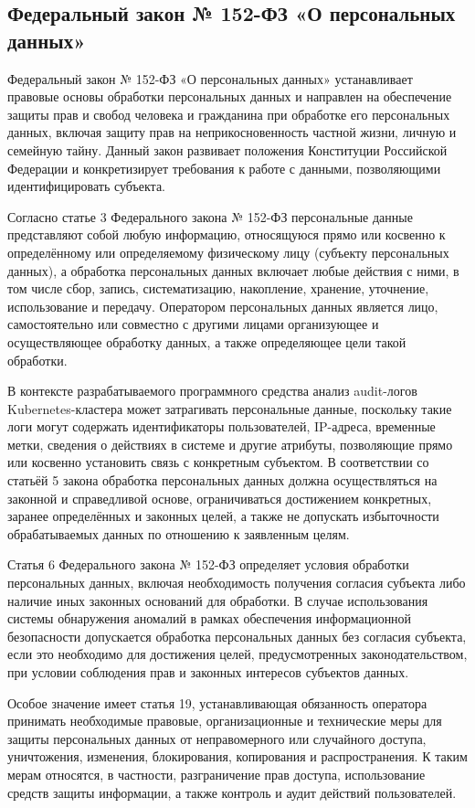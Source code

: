 \subsection{Федеральный закон № 152-ФЗ «О персональных данных»}

Федеральный закон № 152-ФЗ «О персональных данных» устанавливает правовые основы обработки персональных данных и направлен на обеспечение защиты прав и свобод человека и гражданина при обработке его персональных данных, включая защиту прав на неприкосновенность частной жизни, личную и семейную тайну. Данный закон развивает положения Конституции Российской Федерации и конкретизирует требования к работе с данными, позволяющими идентифицировать субъекта.

Согласно статье 3 Федерального закона № 152-ФЗ персональные данные представляют собой любую информацию, относящуюся прямо или косвенно к определённому или определяемому физическому лицу (субъекту персональных данных), а обработка персональных данных включает любые действия с ними, в том числе сбор, запись, систематизацию, накопление, хранение, уточнение, использование и передачу. Оператором персональных данных является лицо, самостоятельно или совместно с другими лицами организующее и осуществляющее обработку данных, а также определяющее цели такой обработки.

В контексте разрабатываемого программного средства анализ audit-логов Kubernetes-кластера может затрагивать персональные данные, поскольку такие логи могут содержать идентификаторы пользователей, IP-адреса, временные метки, сведения о действиях в системе и другие атрибуты, позволяющие прямо или косвенно установить связь с конкретным субъектом. В соответствии со статьёй 5 закона обработка персональных данных должна осуществляться на законной и справедливой основе, ограничиваться достижением конкретных, заранее определённых и законных целей, а также не допускать избыточности обрабатываемых данных по отношению к заявленным целям.

Статья 6 Федерального закона № 152-ФЗ определяет условия обработки персональных данных, включая необходимость получения согласия субъекта либо наличие иных законных оснований для обработки. В случае использования системы обнаружения аномалий в рамках обеспечения информационной безопасности допускается обработка персональных данных без согласия субъекта, если это необходимо для достижения целей, предусмотренных законодательством, при условии соблюдения прав и законных интересов субъектов данных.

Особое значение имеет статья 19, устанавливающая обязанность оператора принимать необходимые правовые, организационные и технические меры для защиты персональных данных от неправомерного или случайного доступа, уничтожения, изменения, блокирования, копирования и распространения. К таким мерам относятся, в частности, разграничение прав доступа, использование средств защиты информации, а также контроль и аудит действий пользователей.


